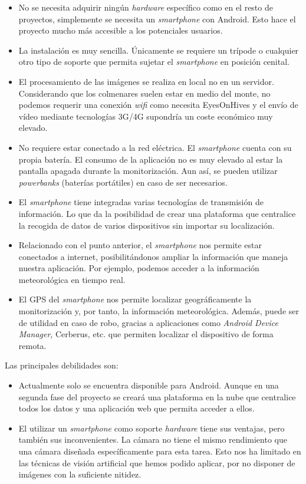 \begin{itemize}
\tightlist
\item
  No se necesita adquirir ningún \emph{hardware} específico como en el
  resto de proyectos, simplemente se necesita un \emph{smartphone} con
  Android. Esto hace el proyecto mucho más accesible a los potenciales
  usuarios.
\item
  La instalación es muy sencilla. Únicamente se requiere un trípode o
  cualquier otro tipo de soporte que permita sujetar el
  \emph{smartphone} en posición cenital.
\item
  El procesamiento de las imágenes se realiza en local no en un
  servidor. Considerando que los colmenares suelen estar en medio del
  monte, no podemos requerir una conexión \emph{wifi} como necesita
  EyesOnHives y el envío de vídeo mediante tecnologías 3G/4G supondría
  un coste económico muy elevado.
\item
  No requiere estar conectado a la red eléctrica. El \emph{smartphone}
  cuenta con su propia batería. El consumo de la aplicación no es muy
  elevado al estar la pantalla apagada durante la monitorización. Aun
  así, se pueden utilizar \emph{powerbanks} (baterías portátiles) en
  caso de ser necesarios.
\item
  El \emph{smartphone} tiene integradas varias tecnologías de
  transmisión de información. Lo que da la posibilidad de crear una
  plataforma que centralice la recogida de datos de varios dispositivos
  sin importar su localización.
\item
  Relacionado con el punto anterior, el \emph{smartphone} nos permite
  estar conectados a internet, posibilitándonos ampliar la información
  que maneja nuestra aplicación. Por ejemplo, podemos acceder a la
  información meteorológica en tiempo real.
\item
  El GPS del \emph{smartphone} nos permite localizar geográficamente la
  monitorización y, por tanto, la información meteorológica. Además,
  puede ser de utilidad en caso de robo, gracias a aplicaciones como
  \emph{Android Device Manager}, Cerberus, etc. que permiten localizar
  el dispositivo de forma remota.
\end{itemize}

Las principales debilidades son:

\begin{itemize}
\tightlist
\item
  Actualmente solo se encuentra disponible para Android. Aunque en una
  segunda fase del proyecto se creará una plataforma en la nube que
  centralice todos los datos y una aplicación web que permita acceder a
  ellos.
\item
  El utilizar un \emph{smartphone} como soporte \emph{hardware} tiene
  sus ventajas, pero también sus inconvenientes. La cámara no tiene el
  mismo rendimiento que una cámara diseñada específicamente para esta
  tarea. Esto nos ha limitado en las técnicas de visión artificial que
  hemos podido aplicar, por no disponer de imágenes con la suficiente
  nitidez.
\end{itemize}
